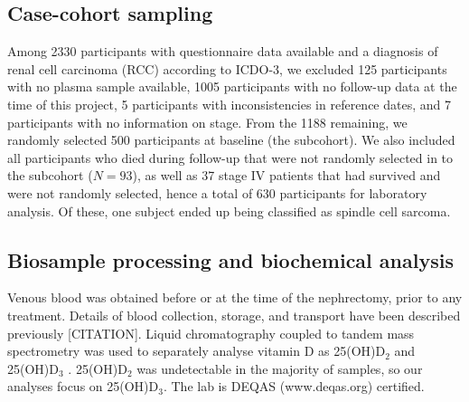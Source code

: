 \documentclass[a4paper,11pt]{article}
\begin{document}
\subsection*{Case-cohort sampling}
Among 2330 participants with questionnaire data available and a diagnosis of 
renal cell carcinoma (RCC) according to ICDO-3, we excluded 125 participants 
with no plasma sample available, 1005 participants with no follow-up data at 
the time of this project, 5 participants with inconsistencies in reference 
dates, and 7 participants with no information on stage. From the 1188 
remaining, we randomly selected 500 participants at baseline (the subcohort). 
We also included all participants who died during follow-up that were not 
randomly selected in to the subcohort ($N=93$), as well as 37 stage IV patients 
that had survived and were not randomly selected, hence a total of 
630 participants for laboratory analysis. Of these, one subject ended up being 
classified as spindle cell sarcoma.

\subsection*{Biosample processing and biochemical analysis}
Venous blood was obtained before or at the time of the nephrectomy, prior to 
any treatment. Details of blood collection, storage, and transport have 
been described previously [CITATION]. Liquid chromatography coupled to tandem 
mass spectrometry was used to separately analyse vitamin D as 25(OH)D$_2$ and 
25(OH)D$_3$ \cite{midttun_determination_2011}. 25(OH)D$_2$ was undetectable in 
the majority of samples, so our analyses focus on 25(OH)D$_3$. The lab is DEQAS 
(www.deqas.org) certified.
\end{document}
